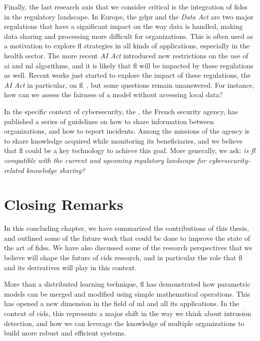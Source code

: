 Finally, the last research axis that we consider critical is the integration of \glspl{fids} in the regulatory landscape.
In Europe, the \gls{gdpr} and the \emph{Data Act} are two major regulations that have a significant impact on the way data is handled, making data sharing and processing more difficult for organizations.
This is often used as a motivation to explore \gls{fl} strategies in all kinds of applications, especially in the health sector.
The more recent \emph{AI Act} introduced new restrictions on the use of \gls{ai} and \gls{ml} algorithms, and it is likely that \gls{fl} will be impacted by these regulations as well.
Recent works just started to explore the impact of these regulations, the \emph{AI Act} in particular, on \gls{fl}~\cite{woisetschlager_FederatedLearningPriorities_2024,woisetschlager_FederatedLearningAI_2024}, but some questions remain unanswered.
For instance, how can we assess the fairness of a model without accessing local data?

In the specific context of cybersecurity, the , the French security agency, has published a series of guidelines on how to share information between organizations, and how to report incidents.
Among the missions of the agency is to share knowledge acquired while monitoring its beneficiaries, and we believe that \gls{fl} could be a key technology to achieve this goal.
More generally, we ask: \emph{is \gls{fl} compatible with the current and upcoming regulatory landscape for cybersecurity-related knowledge sharing?}


\section{Closing Remarks\label{sec:conclusion.closing}}

In this concluding chapter, we have summarized the contributions of this thesis, and outlined some of the future work that could be done to improve the state of the art of \glspl{fids}.
We have also discussed some of the research perspectives that we believe will shape the future of \gls{cids} research, and in particular the role that \gls{fl} and its derivatives will play in this context.

More than a distributed learning technique, \gls{fl} has demonstrated how parametric models can be merged and modified using simple mathematical operations.
This has opened a new dimension in the field of \gls{ml} and all its applications.
In the context of \gls{cids}, this represents a major shift in the way we think about intrusion detection, and how we can leverage the knowledge of multiple organizations to build more robust and efficient systems.
